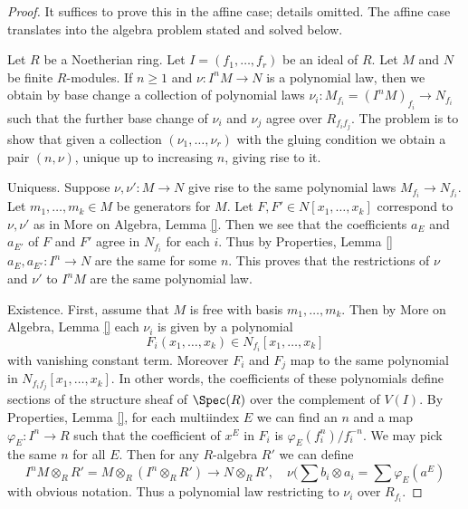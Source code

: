 \begin{proof}
It suffices to prove this in the affine case; details omitted.
The affine case translates into the algebra problem stated and
solved below.

\medskip\noindent
Let $R$ be a Noetherian ring. Let $I = (f_1, \ldots, f_r)$ be an ideal of $R$.
Let $M$ and $N$ be finite $R$-modules.
If $n \geq 1$ and $\nu : I^nM \to N$ is a polynomial law, then
we obtain by base change a collection of polynomial laws
$\nu_i : M_{f_i} = (I^nM)_{f_i} \to N_{f_i}$ such that the further
base change of $\nu_i$ and $\nu_j$ agree over $R_{f_if_j}$.
The problem is to show that given a collection
$(\nu_1, \ldots, \nu_r)$ with the gluing condition
we obtain a pair $(n, \nu)$, unique up to increasing $n$,
giving rise to it.

\medskip\noindent
Uniquess. Suppose $\nu, \nu' : M \to N$ give rise to the same
polynomial laws $M_{f_i} \to N_{f_i}$. Let $m_1, \ldots, m_k \in M$
be generators for $M$. Let $F, F' \in N[x_1, \ldots, x_k]$
correspond to $\nu, \nu'$ as in More on Algebra, Lemma \ref{}.
Then we see that the coefficients $a_E$ and $a_{E'}$ of $F$ and $F'$ agree in
$N_{f_i}$ for each $i$. Thus by Properties, Lemma \ref{}
$a_E, a_{E'} : I^n \to N$ are the same for some $n$. This proves
that the restrictions of $\nu$ and $\nu'$ to $I^nM$ are the same
polynomial law.

\medskip\noindent
Existence. First, assume that $M$ is free with basis $m_1, \ldots, m_k$.
Then by More on Algebra, Lemma \ref{} each
$\nu_i$ is given by a polynomial
$$
F_i(x_1, \ldots, x_k) \in N_{f_i}[x_1, \ldots, x_k]
$$
with vanishing constant term. Moreover $F_i$ and $F_j$ map
to the same polynomial in $N_{f_if_j}[x_1, \ldots, x_k]$.
In other words, the coefficients of these polynomials
define sections of the structure sheaf of $\Spec(R)$
over the complement of $V(I)$. By Properties, Lemma \ref{},
for each multiindex $E$ we can find an $n$ and a map
$\varphi_E : I^n \to R$ such that the coefficient of $x^E$
in $F_i$ is $\varphi_E(f_i^n)/f_i^{-n}$. We may pick the same $n$
for all $E$. Then for any $R$-algebra $R'$ we can define
$$
I^nM \otimes_R R' = M \otimes_R (I^n \otimes_R R') \to N \otimes_R R'
,\quad
\nu(\sum b_i \otimes a_i = \sum \varphi_E(a^E)
$$
with obvious notation. Thus a polynomial law restricting to $\nu_i$
over $R_{f_i}$.


\end{proof}
